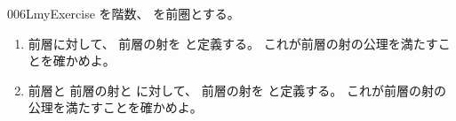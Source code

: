 \documentclass[index]{subfiles}
\begin{document}
\begin{myBlock}{006L}{myExercise}
  を階数、
  を前圏とする。
  \begin{enumerate}
  \item 前層に対して、
    前層の射を
    と定義する。
    これが前層の射の公理を満たすことを確かめよ。
  \item 前層と
    前層の射と
    に対して、
    前層の射を
    と定義する。
    これが前層の射の公理を満たすことを確かめよ。
  \end{enumerate}
\end{myBlock}
\end{document}
